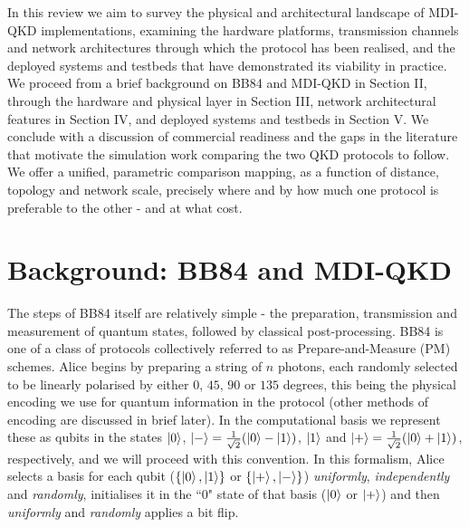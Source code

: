 \documentclass[9pt,technote]{IEEEtran}
\begin{document}
In this review we aim to survey the physical and architectural landscape of MDI-QKD implementations, examining the hardware platforms, transmission channels and network architectures through which the protocol has been realised, and the deployed systems and testbeds that have demonstrated its viability in practice. We proceed from a brief background on BB84 and MDI-QKD in Section II, through the hardware and physical layer in Section III, network architectural features in Section IV, and deployed systems and testbeds in Section V. We conclude with a discussion of commercial readiness and the gaps in the literature that motivate the simulation work comparing the two QKD protocols to follow. We offer a unified, parametric comparison mapping, as a function of distance, topology and network scale, precisely where and by how much one protocol is preferable to the other - and at what cost.

\section{Background: BB84 and MDI-QKD}

The steps of BB84 itself are relatively simple - the preparation, transmission and measurement of quantum states, followed by classical post-processing. BB84 is one of a class of protocols collectively referred to as Prepare-and-Measure (PM) schemes. Alice begins by preparing a string of $n$ photons, each randomly selected to be linearly polarised by either $0$, $45$, $90$ or $135$ degrees, this being the physical encoding we use for quantum information in the protocol (other methods of encoding are discussed in brief later). In the computational basis we represent these as qubits in the states $\ket{0}$, $\ket{-}=\frac{1}{\sqrt2}(\ket{0}-\ket{1})$, $\ket{1}$ and $\ket{+}=\frac{1}{\sqrt2}(\ket{0}+\ket{1})$, respectively, and we will proceed with this convention. In this formalism, Alice selects a basis for each qubit ($\{\ket{0},\ket{1}\}$ or $\{\ket{+},\ket{-}\}$) \textit{uniformly}, \textit{independently} and \textit{randomly}, initialises it in the ``$0$" state of that basis ($\ket{0}$ or $\ket{+}$) and then \textit{uniformly} and \textit{randomly} applies a bit flip.
\end{document}
